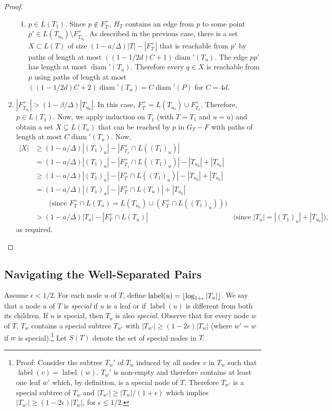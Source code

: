 \documentclass{patmorin}
\DeclareMathOperator{\diam}{diam}
\DeclareMathOperator{\lbl}{label}
\begin{document}
\begin{proof}
\begin{enumerate}
\begin{enumerate}
      \item $p\in L(T_1)$. Since $p\not\in F^+_T$, $H_T$ contains an edge
      from $p$ to some point $p'\in L(T_{u_0})\setminus F^+_{T_{u_0}}$.
      As described in the previous case, there is a set $X\subset
      L(T)$ of size $(1-a/\Delta)|T|-|F^+_{T}|$ that is reachable
      from $p'$ by paths of length at most $((1-1/2d)C+1)\diam'(T_u)$.
      The edge $pp'$ has length at most $\diam'(T_u)$. Therefore every
      $q\in X$ is reachable from $p$ using paths of length at most
      $((1-1/2d)C+2)\diam'(T_u) = C\diam'(P)$ for $C= 4d$.
    \end{enumerate}

    \item $|F^+_{T_{u_0}}|> (1-\beta/\Delta)|T_{u_0}|$.  In this case,
     $F^+_T= L(T_{u_0})\cup F^+_{T_1}$.
     Therefore, $p\in L(T_1)$.  Now, we apply
     induction on $T_1$ (with $T=T_1$ and $u=u$) and obtain a set $X\subseteq L(T_u)$
     that can be reached by $p$ in $G_T-F$ with paths of length at most
     $C\diam'(T_u)$.  Now,
     \begin{align*}
       |X| & \ge (1-a/\Delta)|(T_1)_u| - |F^+_{T_1}\cap L((T_1)_u)| \\
           & =   (1-a/\Delta)|(T_1)_u| - |F^+_{T_1}\cap L((T_1)_u)|
                    - |T_{u_0}| + |T_{u_0}| \\
           & \ge   (1-a/\Delta)|(T_1)_u| - |F^+_{T}\cap L((T_1)_u)|
                    - |T_{u_0}| + |T_{u_0}| \\
           & =   (1-a/\Delta)|(T_1)_u| - |F^+_{T}\cap L(T_u)| + |T_{u_0}| \\
             & \qquad \text{(since $F^+_T\cap L(T_u)= L(T_{u_0}) \cup (F^+_T\cap L((T_1)_u))$)} \\
           & >   (1-a/\Delta)|T_u| - |F^+_{T}\cap L(T_u)| 
             & \text{(since $|T_u|=|(T_1)_u|+|T_{u_0}|$),} 
     \end{align*}
     as required. \qedhere
    \end{enumerate}
\end{proof}


\subsection{Navigating the Well-Separated Pairs}

Assume $\epsilon < 1/2$.  For each node $u$ of $T$, define
$\lbl(u)=\floor{\log_{1+\epsilon}|T_u|}$. We say that a node $u$ of $T$
is \emph{special} if $u$ is a leaf or if $\lbl(u)$ is different from both
its children.  If $u$ is special, then $T_u$ is also \emph{special}.
Observe that for every node $w$ of $T$, $T_w$ contains a special
subtree $T_{w'}$ with $|T_{w'}|\ge (1-2\epsilon)|T_w|$  (where $w'=w$ if $w$ is special).\footnote{Proof:
Consider the subtree $T_w'$ of $T_w$ induced by all nodes $v$ in $T_w$
such that $\lbl(v)=\lbl(w)$. $T_w'$ is non-empty and therefore contains
at least one leaf $w'$ which, by definition, is a special node of $T$.
Therefore $T_{w'}$ is a special subtree of $T_w$ and $|T_{w'}|\ge
|T_w|/(1+\epsilon)$ which implies $|T_{w'}|\ge (1-2\epsilon)|T_w|$, for
$\epsilon \le 1/2$.} Let $S(T)$ denote the set of special nodes in $T$.
\end{document}
